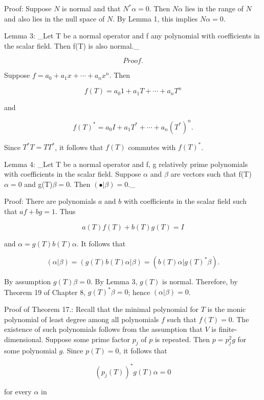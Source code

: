 Proof: Suppose \(N\) is normal and that \(N^{*}\alpha=0\). Then \(N\alpha\) lies in the range of \(N\) and also lies in the null space of \(N\). By Lemma 1, this implies \(N\alpha=0\).

Lemma 3: _Let T be a normal operator and f any polynomial with coefficients in the scalar field. Then f(T) is also normal._

\[Proof.\]

Suppose \(f=a_{0}+a_{1}x+\cdots+a_{n}x^{n}\). Then

\[f(T)=a_{0}1+a_{1}T+\cdots+a_{n}T^{n}\]

and

\[f(T)^{*}=a_{0}I+a_{1}T^{*}+\cdots+a_{n}(T^{*})^{n}.\]

Since \(T^{*}T=TT^{*}\), it follows that \(f(T)\) commutes with \(f(T)^{*}\).

Lemma 4: _Let T be a normal operator and f, g relatively prime polynomials with coefficients in the scalar field. Suppose \(\alpha\) and \(\beta\) are vectors such that f(T)\(\alpha=0\) and g(T)\(\beta=0\). Then \((\bullet|\beta)=0\)._

Proof: There are polynomials \(a\) and \(b\) with coefficients in the scalar field such that \(a\!f+bg=1\). Thus

\[a(T)f(T)+b(T)g(T)=I\]

and \(\alpha=g(T)b(T)\alpha\). It follows that

\[(\alpha|\beta)=(g(T)b(T)\alpha|\beta)=(b(T)\alpha|g(T)^{*}\beta).\]

By assumption \(g(T)\beta=0\). By Lemma 3, \(g(T)\) is normal. Therefore, by Theorem 19 of Chapter 8, \(g(T)^{*}\beta=0\); hence \((\alpha|\beta)=0\).

Proof of Theorem 17.: Recall that the minimal polynomial for \(T\) is the monic polynomial of least degree among all polynomials \(f\) such that \(f(T)=0\). The existence of such polynomials follows from the assumption that \(V\) is finite-dimensional. Suppose some prime factor \(p_{j}\) of \(p\) is repeated. Then \(p=p_{j}^{2}g\) for some polynomial \(g\). Since \(p(T)=0\), it follows that

\[(p_{j}(T))^{*}g(T)\alpha=0\]

for every \(\alpha\) in \ 